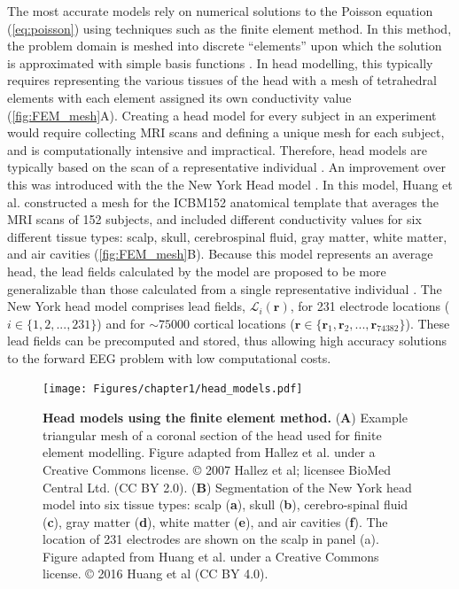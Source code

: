 The most accurate models rely on numerical solutions to the Poisson equation (\ref{eq:poisson}) using techniques such as the finite element method. In this method, the problem domain is meshed into discrete ``elements'' upon which the solution is approximated with simple basis functions \cite{Liu2014}. In head modelling, this typically requires representing the various tissues of the head with a mesh of tetrahedral elements with each element assigned its own conductivity value \cite{Hallez2007} (\autoref{fig:FEM_mesh}{A}). Creating a head model for every subject in an experiment would require collecting MRI scans and defining a unique mesh for each subject, and is computationally intensive and impractical. Therefore, head models are typically based on the scan of a representative individual \cite{Holmes1998}. An improvement over this was introduced with the the New York Head model \cite{Huang2016}. In this model, Huang et al. \cite{Huang2016} constructed a mesh for the ICBM152 anatomical template that averages the MRI scans of 152 subjects, and included different conductivity values for six different tissue types: scalp, skull, cerebrospinal fluid, gray matter, white matter, and air cavities (\autoref{fig:FEM_mesh}B). Because this model represents an average head, the lead fields calculated by the model are proposed to be more generalizable than those calculated from a single representative individual \cite{Huang2016}. The New York head model comprises lead fields, $\mathcal{L}_i(\bm{r})$, for 231 electrode locations ($i\in\{1,2,...,231\}$) and for  ${\sim}75000$ cortical locations ($\bm{r}\in\{ \bm{r}_1, \bm{r}_2, ..., \bm{r}_{74382} \}$). These lead fields can be precomputed and stored, thus allowing high accuracy solutions to the forward EEG problem with low computational costs.

\begin{figure}[t!]
    \centering
    \texttt{[image: Figures/chapter1/head\_models.pdf]}
    
    \caption{\textbf{Head models using the finite element method.} 
    (\textbf{A}) Example triangular mesh of a coronal section of the head used for finite element modelling. Figure adapted from Hallez et al. \cite{Hallez2007} under a Creative Commons license. © 2007 Hallez et al; licensee BioMed Central Ltd. (CC BY 2.0).
    (\textbf{B}) Segmentation of the New York head model into six tissue types: scalp (\textbf{a}), skull (\textbf{b}), cerebro-spinal fluid (\textbf{c}), gray matter (\textbf{d}), white matter (\textbf{e}), and air cavities (\textbf{f}). The location of 231 electrodes are shown on the scalp in panel (a). Figure adapted from Huang et al. \cite{Huang2016} under a Creative Commons license. © 2016 Huang et al (CC BY 4.0).
    } 
    \label{fig:FEM_mesh}
\end{figure}

